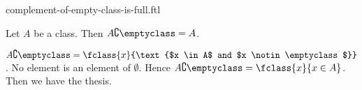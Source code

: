 \documentclass{article}
\begin{document}
\begin{smodule}[creators={Marcel Schütz}]{complement-of-empty-class-is-full.ftl}

  \begin{fproposition*}[label=771302931562496]
    Let $A$ be a class.
    Then $A \complement \emptyclass = A$.
  \end{fproposition*}
  \begin{fproof}
    $A \complement \emptyclass = \fclass{x}{\text{$x \in A$ and $x \notin \emptyclass$}}$.
    No element is an element of $\emptyset$.
    Hence $A \complement \emptyclass = \fclass{x}{x \in A}$.
    Then we have the thesis.
  \end{fproof}
\end{smodule}
\end{document}
